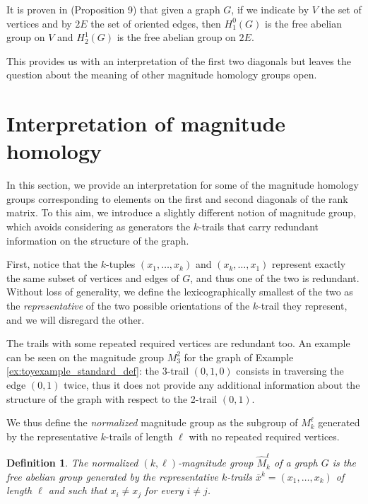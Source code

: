 \documentclass{article}
\newtheorem{definition}{Definition}
\begin{document}
	It is proven in \cite{hepworth2015categorifying} (Proposition 9) that given a graph $G$, if we indicate by $V$ the set of vertices and by $2E$ the set of oriented edges, then $H_1^0(G)$ is the free abelian group on $V$ and $H_2^1(G)$ is the free abelian group on $2E$.
	
	This provides us with an interpretation of the first two diagonals but leaves the question about the meaning of other magnitude homology groups open.
	
	\section{Interpretation of magnitude homology}\label{sec:subgraphs}
	
	In this section, we provide an interpretation for some of the magnitude homology groups corresponding to elements on the first and second diagonals of the rank matrix.
	To this aim, we introduce a slightly different notion of magnitude group, which avoids considering as generators the $k$-trails that carry redundant information on the structure of the graph. 
	
	First, notice that the $k$-tuples $(x_1,\dots,x_k)$ and $(x_k,\dots,x_1)$ represent exactly the same subset of vertices and edges of $G$, and thus one of the two is redundant. Without loss of generality, we define the lexicographically smallest of the two as the \emph{representative} of the two possible orientations of the $k$-trail they represent, and we will disregard the other.
	
	The trails with some repeated required vertices are redundant too. An example can be seen on the magnitude group $M_{3}^{2}$ for the graph of Example \ref{ex:toyexample_standard_def}:
	the 3-trail $(0, 1, 0)$ consists in traversing the edge $(0, 1)$ twice, thus it does not provide any additional information about the structure of the graph with respect to the 2-trail $(0,1)$. 
	
	We thus define the \emph{normalized} magnitude group as the subgroup of $M_{k}^{\ell}$ generated by the representative $k$-trails of length $\ell$ with no repeated required vertices.
	
	\begin{definition}\label{def:normalised}
		The normalized $(k,\ell)$-magnitude group $\widehat{M}_{k}^{\ell}$ of a graph $G$ is the free abelian group generated by the representative $k$-trails $\overline{x}^k=(x_1,\dots,x_k)$ of length $\ell$ and such that $x_i \neq x_j$ for every $i\neq j$.
	\end{definition}
	
\end{document}
